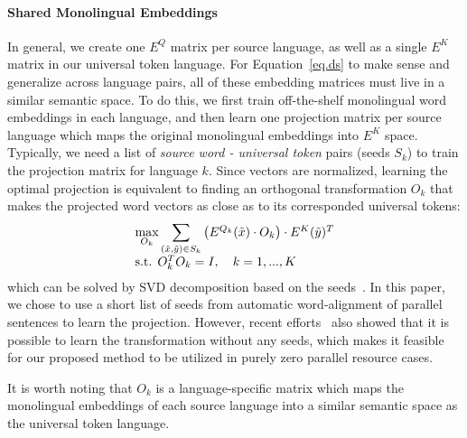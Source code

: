 \paragraph{Shared Monolingual Embeddings}
In general, we create one $E^Q$ matrix per source language, as well as a single $E^K$ matrix in our universal token language. For Equation~\ref{eq.ds} to make sense and generalize across language pairs, all of these embedding matrices must live in a similar semantic space. To do this, we first train off-the-shelf monolingual word embeddings in each language, and then learn one projection matrix per source language which maps the original monolingual embeddings into $E^K$ space.
Typically, we need a list of \textit{source word - universal token} pairs (seeds $S_k$) to train the projection matrix for language $k$. Since vectors are normalized, learning the optimal projection is equivalent to finding an orthogonal transformation $O_k$ that makes the projected word vectors as close as to its corresponded universal tokens:
\begin{equation}
  \begin{array}{l}  
         \max\limits_{O_k}\mathlarger{\sum}\limits_{(\tilde{x}, \tilde{y})\in S_k}  \left(E^{Q_k}(\tilde{x})\cdot O_k\right)\cdot E^K(\tilde{y})^T \\  
         \text{s.t.       } O_k^TO_k = I, \ \ \ k=1, ..., K
 \end{array}  
\end{equation}
which can be solved by SVD decomposition based on the seeds~\cite{smith2017offline}. In this paper, we chose to use a short list of seeds from automatic word-alignment of parallel sentences  to learn the projection. However, recent efforts~\cite{Artetxe2017LearningBW,Conneau2017WordTW}   also showed that it is possible to learn the transformation without any seeds, which makes it feasible  for our  proposed method to be utilized in purely zero parallel resource cases.

It is worth noting that  $O_k$ is a language-specific matrix which maps the monolingual embeddings of each source language into a similar semantic space as the universal token language.

